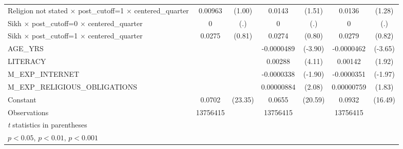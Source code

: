 {\begin{tabular}{l*{3}{cc}}
Religion not stated $\times$ post\_cutoff=1 $\times$ centered\_quarter&     0.00963         &      (1.00)&      0.0143         &      (1.51)&      0.0136         &      (1.28)\\
Sikh $\times$ post\_cutoff=0 $\times$ centered\_quarter&           0         &         (.)&           0         &         (.)&           0         &         (.)\\
Sikh $\times$ post\_cutoff=1 $\times$ centered\_quarter&      0.0275         &      (0.81)&      0.0274         &      (0.80)&      0.0279         &      (0.82)\\
AGE\_YRS             &                     &            &  -0.0000489\sym{***}&     (-3.90)&  -0.0000462\sym{***}&     (-3.65)\\
LITERACY            &                     &            &     0.00288\sym{***}&      (4.11)&     0.00142         &      (1.92)\\
M\_EXP\_INTERNET      &                     &            &  -0.0000338         &     (-1.90)&  -0.0000351\sym{*}  &     (-1.97)\\
M\_EXP\_RELIGIOUS\_OBLIGATIONS&                     &            &  0.00000884\sym{*}  &      (2.08)&  0.00000759         &      (1.83)\\
Constant            &      0.0702\sym{***}&     (23.35)&      0.0655\sym{***}&     (20.59)&      0.0932\sym{***}&     (16.49)\\
\hline
Observations        &    13756415         &            &    13756415         &            &    13756415         &            \\
\hline\hline
\multicolumn{7}{l}{\footnotesize \textit{t} statistics in parentheses}\\
\multicolumn{7}{l}{\footnotesize \sym{*} \(p<0.05\), \sym{**} \(p<0.01\), \sym{***} \(p<0.001\)}\\
\end{tabular}
}
